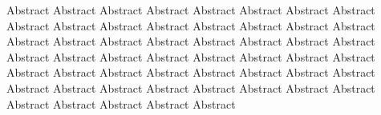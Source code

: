 \abstract

Abstract Abstract Abstract Abstract Abstract Abstract Abstract Abstract Abstract Abstract Abstract Abstract Abstract Abstract Abstract Abstract Abstract Abstract Abstract Abstract Abstract Abstract Abstract Abstract Abstract Abstract Abstract Abstract Abstract Abstract Abstract Abstract Abstract Abstract Abstract Abstract Abstract Abstract\cite{9020094} Abstract Abstract Abstract Abstract Abstract Abstract Abstract Abstract Abstract Abstract Abstract Abstract Abstract Abstract Abstract 
